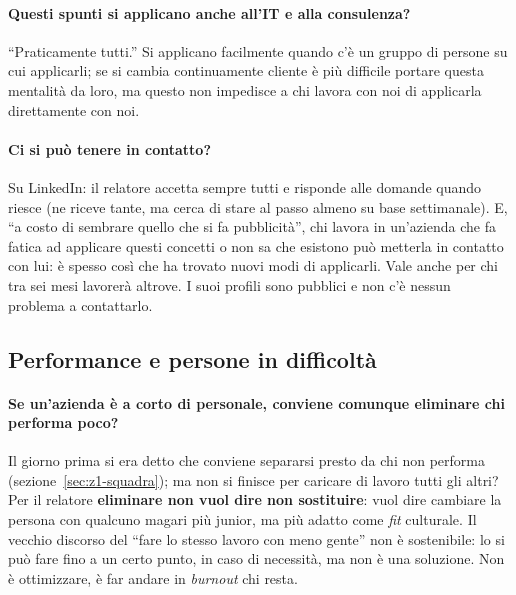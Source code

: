 \paragraph{Questi spunti si applicano anche all'IT e alla consulenza?} ``Praticamente tutti.'' Si applicano
facilmente quando c'è un gruppo di persone su cui applicarli; se si cambia continuamente cliente è più
difficile portare questa mentalità da loro, ma questo non impedisce a chi lavora con noi di applicarla
direttamente con noi.

\paragraph{Ci si può tenere in contatto?} Su LinkedIn: il relatore accetta sempre tutti e risponde alle
domande quando riesce (ne riceve tante, ma cerca di stare al passo almeno su base settimanale). E, ``a costo
di sembrare quello che si fa pubblicità'', chi lavora in un'azienda che fa fatica ad applicare questi
concetti o non sa che esistono può metterla in contatto con lui: è spesso così che ha trovato nuovi modi di
applicarli. Vale anche per chi tra sei mesi lavorerà altrove. I suoi profili sono pubblici e non c'è nessun
problema a contattarlo.

\subsection{Performance e persone in difficoltà}

\paragraph{Se un'azienda è a corto di personale, conviene comunque eliminare chi performa poco?} Il giorno
prima si era detto che conviene separarsi presto da chi non performa (sezione~\ref{sec:z1-squadra}); ma non
si finisce per caricare di lavoro tutti gli altri? Per il relatore \textbf{eliminare non vuol dire non
sostituire}: vuol dire cambiare la persona con qualcuno magari più junior, ma più adatto come \emph{fit}
culturale. Il vecchio discorso del ``fare lo stesso lavoro con meno gente'' non è sostenibile: lo si può fare
fino a un certo punto, in caso di necessità, ma non è una soluzione. Non è ottimizzare, è far andare in
\emph{burnout} chi resta.


